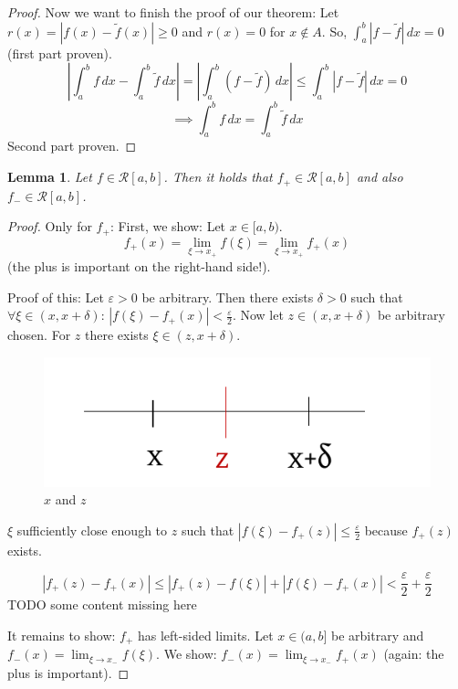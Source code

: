 \documentclass{article}
\newtheorem{lemma}{Lemma}  \numberwithin{lemma}{section}
\newcommand{\card}[1]{\left|#1\right|}
\begin{document}
\begin{proof}
  Now we want to finish the proof of our theorem: Let $r(x) = \card{f(x) - \tilde f(x)} \geq 0$ and $r(x) = 0$ for $x \not\in A$.
  So, $\int_a^b \card{f - \tilde f} \, dx = 0$ (first part proven).
  \[ \card{\int_a^b f \, dx - \int_a^b \tilde f \, dx} = \card{\int_a^b (f - \tilde f) \, dx} \leq \int_a^b \card{f - \tilde f} \, dx = 0 \]
  \[ \implies \int_a^b f\, dx = \int_a^b \tilde f \, dx \]
  Second part proven.
\end{proof}

\begin{lemma} %
  Let $f \in \mathcal R[a,b]$. Then it holds that $f_+ \in \mathcal R[a,b]$ and also $f_- \in \mathcal R[a,b]$.
\end{lemma}
\begin{proof}
  Only for $f_+$: First, we show: Let $x \in [a,b)$.
  \[ f_+(x) = \lim_{\xi \to x_+} f(\xi) = \lim_{\xi \to x_+} f_+(x) \]
  (the plus is important on the right-hand side!).

  Proof of this: Let $\varepsilon > 0$ be arbitrary. Then there exists $\delta > 0$ such that
  $\forall \xi \in (x, x + \delta)$: $\card{f(\xi) - f_+(x)} < \frac\varepsilon2$.
  Now let $z \in (x, x + \delta)$ be arbitrary chosen. For $z$ there exists $\xi \in (z, x + \delta)$.

  \begin{figure}[t]
    \begin{center}
      \includegraphics{img/20_x_z.pdf}
      \caption{$x$ and $z$}
      \label{img:xz}
    \end{center}
  \end{figure}

  $\xi$ sufficiently close enough to $z$ such that $\card{f(\xi) - f_+(z)} \leq \frac\varepsilon2$ because $f_+(z)$ exists.

  \[ \card{f_+(z) - f_+(x)} \leq \card{f_+(z) - f(\xi)} + \card{f(\xi) - f_+(x)} < \frac\varepsilon2 + \frac\varepsilon2 \]
  TODO some content missing here

  It remains to show: $f_+$ has left-sided limits.
  Let $x \in (a,b]$ be arbitrary and $f_-(x) = \lim_{\xi \to x_-} f(\xi)$. We show: $f_-(x) = \lim_{\xi \to x_-} f_+(x)$ (again: the plus is important).


\end{proof}
\end{document}
